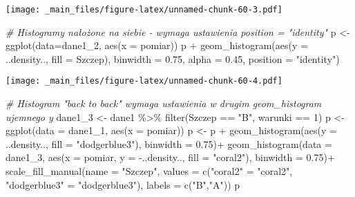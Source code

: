 \documentclass[
]{book}
\newenvironment{Shaded}{\begin{snugshade}}{\end{snugshade}}
\newcommand{\AttributeTok}[1]{\textcolor[rgb]{0.77,0.63,0.00}{#1}}
\newcommand{\CommentTok}[1]{\textcolor[rgb]{0.56,0.35,0.01}{\textit{#1}}}
\newcommand{\DecValTok}[1]{\textcolor[rgb]{0.00,0.00,0.81}{#1}}
\newcommand{\FloatTok}[1]{\textcolor[rgb]{0.00,0.00,0.81}{#1}}
\newcommand{\FunctionTok}[1]{\textcolor[rgb]{0.00,0.00,0.00}{#1}}
\newcommand{\NormalTok}[1]{#1}
\newcommand{\OtherTok}[1]{\textcolor[rgb]{0.56,0.35,0.01}{#1}}
\newcommand{\SpecialCharTok}[1]{\textcolor[rgb]{0.00,0.00,0.00}{#1}}
\newcommand{\StringTok}[1]{\textcolor[rgb]{0.31,0.60,0.02}{#1}}
\begin{document}
\texttt{[image: \_main\_files/figure-latex/unnamed-chunk-60-3.pdf]}

\begin{Shaded}
\begin{Highlighting}[]
\CommentTok{\# Histogramy nałożone na siebie {-} wymaga ustawienia position = "identity"}
\NormalTok{p }\OtherTok{\textless{}{-}} \FunctionTok{ggplot}\NormalTok{(}\AttributeTok{data=}\NormalTok{dane1\_2, }\FunctionTok{aes}\NormalTok{(}\AttributeTok{x =}\NormalTok{ pomiar))}
\NormalTok{p }\SpecialCharTok{+} \FunctionTok{geom\_histogram}\NormalTok{(}\FunctionTok{aes}\NormalTok{(}\AttributeTok{y =}\NormalTok{ ..density.., }\AttributeTok{fill =}\NormalTok{ Szczep), }\AttributeTok{binwidth =} \FloatTok{0.75}\NormalTok{, }\AttributeTok{alpha =} \FloatTok{0.45}\NormalTok{, }\AttributeTok{position =} \StringTok{"identity"}\NormalTok{)}
\end{Highlighting}
\end{Shaded}

\texttt{[image: \_main\_files/figure-latex/unnamed-chunk-60-4.pdf]}

\begin{Shaded}
\begin{Highlighting}[]
\CommentTok{\# Histogram "back to back" wymaga ustawienia w drugim geom\_histogram ujemnego y}
\NormalTok{dane1\_3 }\OtherTok{\textless{}{-}}\NormalTok{ dane1 }\SpecialCharTok{\%\textgreater{}\%} \FunctionTok{filter}\NormalTok{(Szczep }\SpecialCharTok{==} \StringTok{"B"}\NormalTok{, warunki }\SpecialCharTok{==} \DecValTok{1}\NormalTok{)}
\NormalTok{p }\OtherTok{\textless{}{-}} \FunctionTok{ggplot}\NormalTok{(}\AttributeTok{data =}\NormalTok{ dane1\_1, }\FunctionTok{aes}\NormalTok{(}\AttributeTok{x =}\NormalTok{ pomiar))}
\NormalTok{p }\OtherTok{\textless{}{-}}\NormalTok{ p }\SpecialCharTok{+} \FunctionTok{geom\_histogram}\NormalTok{(}\FunctionTok{aes}\NormalTok{(}\AttributeTok{y =}\NormalTok{ ..density.., }\AttributeTok{fill =} \StringTok{"dodgerblue3"}\NormalTok{), }\AttributeTok{binwidth =} \FloatTok{0.75}\NormalTok{)}\SpecialCharTok{+}
  \FunctionTok{geom\_histogram}\NormalTok{(}\AttributeTok{data =}\NormalTok{ dane1\_3, }\FunctionTok{aes}\NormalTok{(}\AttributeTok{x =}\NormalTok{ pomiar, }\AttributeTok{y =} \SpecialCharTok{{-}}\NormalTok{..density.., }\AttributeTok{fill =} \StringTok{"coral2"}\NormalTok{),}
                 \AttributeTok{binwidth =} \FloatTok{0.75}\NormalTok{)}\SpecialCharTok{+}
  \FunctionTok{scale\_fill\_manual}\NormalTok{(}\AttributeTok{name =} \StringTok{"Szczep"}\NormalTok{,}
                    \AttributeTok{values =} \FunctionTok{c}\NormalTok{(}\StringTok{"coral2"} \OtherTok{=} \StringTok{"coral2"}\NormalTok{, }\StringTok{"dodgerblue3"} \OtherTok{=} \StringTok{"dodgerblue3"}\NormalTok{), }
                    \AttributeTok{labels =} \FunctionTok{c}\NormalTok{(}\StringTok{"B"}\NormalTok{,}\StringTok{"A"}\NormalTok{))}
\NormalTok{p}
\end{Highlighting}
\end{Shaded}
\end{document}
